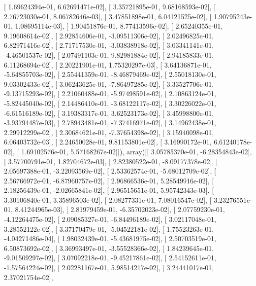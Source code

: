 \documentclass{article}
\begin{document}
       [  1.69624394e-01,   6.62691471e-02],
       [  3.35721895e-01,   9.68168593e-02],
       [  2.76723030e-01,   8.06782646e-03],
       [  3.47851898e-01,   6.04121525e-02],
       [  1.90795243e-01,   1.08695114e-03],
       [  1.90451876e-01,   8.77413596e-02],
       [  2.65240355e-01,   9.19608614e-02],
       [  2.92854606e-01,  -3.09511306e-02],
       [  2.02496825e-01,   6.82971416e-02],
       [  2.71717530e-01,  -3.03838918e-02],
       [  3.03341141e-01,  -4.46501537e-02],
       [  2.07491103e-01,   9.82981884e-02],
       [  2.94185833e-01,   6.11268694e-02],
       [  2.20221901e-01,   1.75320297e-03],
       [  3.64136871e-01,  -5.64855703e-02],
       [  2.55441359e-01,  -8.46879469e-02],
       [  2.55018130e-01,   9.03302433e-02],
       [  3.06243625e-01,  -7.86497285e-02],
       [  3.33527706e-01,  -9.13715293e-02],
       [  2.21060488e-01,  -5.97498591e-02],
       [  2.10863124e-01,  -5.82445040e-02],
       [  2.14486410e-01,  -3.68122117e-02],
       [  3.30226022e-01,  -6.61516189e-02],
       [  3.19383317e-01,   3.62523173e-02],
       [  3.45998800e-01,  -3.93794487e-03],
       [  2.78943481e-01,  -7.37416971e-02],
       [  3.14962438e-01,   2.29912299e-02],
       [  2.30684621e-01,  -7.37654398e-02],
       [  3.15940098e-01,   6.06403732e-03],
       [  2.24650028e-01,   9.81153801e-02],
       [  3.16990172e-01,   6.61240178e-02],
       [  1.69102576e-01,   5.57168267e-02]]), array([[  3.05785370e-01,  -6.28354843e-02],
       [  3.57700791e-01,   1.82704672e-03],
       [  2.82380522e-01,  -8.09177378e-02],
       [  2.05697388e-01,  -3.22093569e-02],
       [  2.53362574e-01,  -5.68012709e-02],
       [  2.56766972e-01,  -6.87960757e-02],
       [  2.96866536e-01,   5.28549916e-02],
       [  2.18256439e-01,  -2.02665841e-02],
       [  2.96515651e-01,   5.95742343e-03],
       [  3.30106840e-01,   3.35896503e-02],
       [  2.08277331e-01,   7.08016547e-02],
       [  3.23276551e-01,   8.41244965e-03],
       [  2.81979459e-01,  -6.35702023e-02],
       [  2.07759230e-01,  -4.12264475e-02],
       [  2.09085327e-01,  -6.84496189e-02],
       [  3.02117048e-01,   3.28552122e-02],
       [  3.37170479e-01,  -5.04522181e-02],
       [  1.75523263e-01,  -4.04271486e-04],
       [  1.98032439e-01,  -5.43681975e-02],
       [  2.50703519e-01,   6.50873692e-02],
       [  3.36993497e-01,  -3.55528366e-02],
       [  1.84239645e-01,  -9.01509297e-02],
       [  3.07092218e-01,  -9.45217861e-02],
       [  2.54152611e-01,  -1.57564224e-02],
       [  2.02281167e-01,   5.98514217e-02],
       [  3.24441017e-01,   2.37021754e-02],
\end{document}
